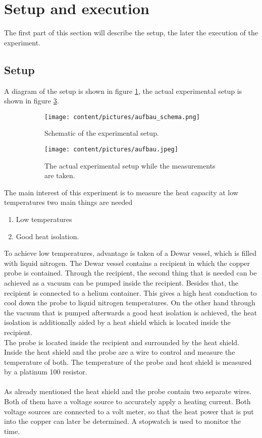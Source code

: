 \newpage
\section{Setup and execution}
\label{sec:durchfuerung}
The first part of this section will describe the setup, the later the execution of the experiment.
\subsection{Setup}
A diagram of the setup is shown in figure \ref{fig:setup_scheme}, the actual experimental setup is shown in figure \ref{fig:setup_actual}.
\begin{figure}
    \begin{subfigure}{0.48\textwidth}%
        \centering
        \texttt{[image: content/pictures/aufbau\_schema.png]}
        \caption{Schematic of the experimental setup. \cite{anleitung}}
        \label{fig:setup_scheme}
    \end{subfigure}%
    \hfill
    \begin{subfigure}{0.48\textwidth}%
        \centering
        \texttt{[image: content/pictures/aufbau.jpeg]}
        \caption{The actual experimental setup while the measurements are taken.}
        \label{fig:setup_actual}
    \end{subfigure}
    \caption{}
\end{figure}
The main interest of this experiment is to measure the heat capacity at low temperatures two main things are needed
\begin{enumerate}
    \item Low temperatures
    \item Good heat isolation.
\end{enumerate}
To achieve low temperatures, advantage is taken of a Dewar vessel, which is filled with liquid nitrogen.
The Dewar vessel contains a recipient in which the copper probe is contained.
Through the recipient, the second thing that is needed can be achieved as a vacuum can be pumped inside the recipient.
Besides that, the recipient is connected to a helium container.
This gives a high heat conduction to cool down the probe to liquid nitrogen temperatures.
On the other hand through the vacuum that is pumped afterwards a good heat isolation is achieved, the heat isolation is additionally aided by a heat shield which is located inside the recipient.\\
The probe is located inside the recipient and surrounded by the heat shield. 
Inside the heat shield and the probe are a wire to control and measure the temperature of both.
The temperature of the probe and heat shield is measured by a platinum 100 resistor.\\\\
As already mentioned the heat shield and the probe contain two separate wires.
Both of them have a voltage source to accurately apply a heating current.
Both voltage sources are connected to a volt meter, so that the heat power that is put into the copper can later be determined.
A stopwatch is used to monitor the time.

